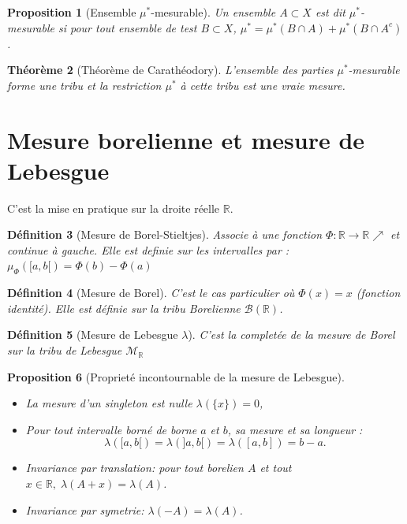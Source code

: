 \documentclass[a4paper,12pt,french]{report}
\theoremstyle{break}
\newtheorem{defin}{Définition}[section]
\newtheorem{theo}[defin]{Théorème}
\newtheorem{prop}[defin]{Proposition}
\begin{document}
\begin{prop}[Ensemble $\mu^{*}$-mesurable]
       Un ensemble $A \subset X$ est dit $\mu^{*}$-mesurable si pour tout ensemble de test $B \subset X$, $\mu^{*} = \mu^{*}(B \cap A) + \mu^{*}(B \cap A^{c})$.
\end{prop}

\begin{theo}[Théorème de Carathéodory]
       L'ensemble des parties $\mu^{*}$-mesurable forme une tribu et la restriction $\mu^{*}$ à cette tribu est une vraie mesure.
\end{theo}

\section{Mesure borelienne et mesure de Lebesgue}
C'est la mise en pratique sur la droite réelle $\mathbb{R}$.

\begin{defin}[Mesure de Borel-Stieltjes]
       Associe à une fonction $\Phi : \mathbb{R} \rightarrow \mathbb{R} \nearrow$ et continue à gauche.
       Elle est definie sur les intervalles par : $\mu_{\Phi}([a, b[) = \Phi(b) - \Phi(a)$
\end{defin}

\begin{defin}[Mesure de Borel]
       C'est le cas particulier où $\Phi (x) = x$ (fonction identité). Elle est définie sur la tribu Borelienne $\mathcal{B}(\mathbb{R})$.
\end{defin}

\begin{defin}[Mesure de Lebesgue $\lambda$]
       C'est la completée de la mesure de Borel sur la tribu de Lebesgue $\mathcal{M}_{\mathbb{R}}$
\end{defin}

\begin{prop}[Proprieté incontournable de la mesure de Lebesgue]
       \begin{itemize}
              \item La mesure d'un singleton est nulle $\lambda(\{ x \})=0$,
              \item Pour tout intervalle borné de borne $a$ et $b$, sa mesure et sa longueur : $$\lambda([a,b[) = \lambda(]a,b[) = \lambda([a,b]) = b-a .$$
              \item Invariance par translation: pour tout borelien $A$ et tout $x \in \mathbb{R}, \; \lambda(A + x) = \lambda(A)$.
              \item Invariance par symetrie: $\lambda(-A) = \lambda(A)$.
       \end{itemize}
\end{prop}
\end{document}
